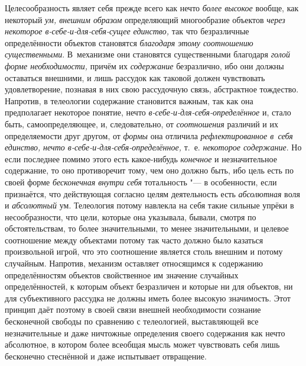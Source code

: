 Целесообразность являет себя прежде всего как нечто
{\em более высокое}
вообще, как некоторый
{\em ум, внешним образом}
определяющий многообразие объектов
{\em через некоторое
в-себе-и-для-себя-сущее единство,} так что безразличные
определённости объектов становятся
{\em благодаря этому соотношению
существенными}. В~механизме они становятся существенными
благодаря {\em голой форме
необходимости,} причём их
{\em содержание}
безразлично, ибо они должны оставаться внешними, и лишь
рассудок как таковой должен чувствовать удовлетворение, познавая в них свою
рассудочную связь, абстрактное тождество. Напротив, в телеологии содержание
становится важным, так как она предполагает некоторое понятие, нечто
{\em в-себе-и-для-себя-определённое}
и, стало быть, самоопределяющее, и, следовательно, от
{\em соотношения}
различий и их определяемости друг другом, от
{\em формы} она отличила
{\em рефлектированное в~себя единство,}
{\em нечто
в-себе-и-для-себя-определённое,} т.~е.
{\em некоторое содержание}.
Но если последнее помимо этого есть какое-нибудь
{\em конечное} и
незначительное содержание, то оно противоречит тому, чем оно должно быть,
ибо цель есть по своей форме
{\em бесконечная внутри себя}
тотальность "--- в особенности, если признаётся,
что действующая согласно целям деятельность есть
{\em абсолютная} воля и
{\em абсолютный} ум.
Телеология потому навлекла на себя такие сильные упрёки в несообразности,
что цели, которые она указывала, бывали, смотря по обстоятельствам, то
более значительными, то менее значительными, и целевое соотношение между
объектами потому так часто должно было казаться произвольной игрой, что это
соотношение является столь внешним и потому случайным. Напротив, механизм
оставляет относящимся к содержанию определённостям объектов свойственное им
значение случайных определённостей, к которым объект безразличен и которые
ни для объектов, ни для субъективного рассудка не должны
иметь более высокую значимость. Этот принцип даёт поэтому в своей связи
внешней необходимости сознание бесконечной свободы по сравнению с
телеологией, выставляющей все незначительные и даже ничтожные определения
своего содержания как нечто абсолютное, в котором более всеобщая мысль
может чувствовать себя лишь бесконечно стеснённой и даже испытывает
отвращение.

